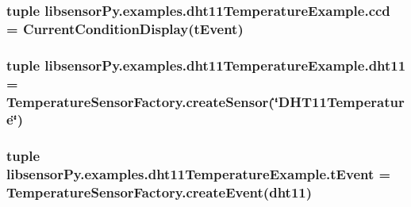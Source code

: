 \subsubsection[{ccd}]{\setlength{\rightskip}{0pt plus 5cm}tuple libsensor\+Py.\+examples.\+dht11\+Temperature\+Example.\+ccd = Current\+Condition\+Display({\bf t\+Event})}\label{namespacelibsensorPy_1_1examples_1_1dht11TemperatureExample_af0b4fb6c06fcff682ba493eac4c04f2e}
\hypertarget{namespacelibsensorPy_1_1examples_1_1dht11TemperatureExample_ac079f6bb33b701ef7b3064d66cf363a3}{}
\subsubsection[{dht11}]{\setlength{\rightskip}{0pt plus 5cm}tuple libsensor\+Py.\+examples.\+dht11\+Temperature\+Example.\+dht11 = {\bf Temperature\+Sensor\+Factory.\+create\+Sensor}(\char`\"{}D\+H\+T11\+Temperature\char`\"{})}\label{namespacelibsensorPy_1_1examples_1_1dht11TemperatureExample_ac079f6bb33b701ef7b3064d66cf363a3}
\hypertarget{namespacelibsensorPy_1_1examples_1_1dht11TemperatureExample_a9c5872a6f21b4ef6be39ee6219088d6e}{}
\subsubsection[{t\+Event}]{\setlength{\rightskip}{0pt plus 5cm}tuple libsensor\+Py.\+examples.\+dht11\+Temperature\+Example.\+t\+Event = {\bf Temperature\+Sensor\+Factory.\+create\+Event}({\bf dht11})}\label{namespacelibsensorPy_1_1examples_1_1dht11TemperatureExample_a9c5872a6f21b4ef6be39ee6219088d6e}
